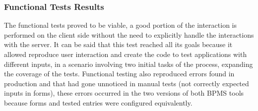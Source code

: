 \documentclass[runningheads,a4paper]{llncs}
\begin{document}
\subsubsection{Functional Tests Results}
The functional tests proved to be viable, a good portion of the interaction is performed on the client side without the need to explicitly handle the interactions with the server. It can be said that this test reached all its goals because it allowed reproduce user interaction and create the code to test applications with different inputs, in a scenario involving two initial tasks of the process, expanding the coverage of the tests. Functional testing also reproduced errors found in production and that had gone unnoticed in manual tests (not correctly expected inputs in forms), these errors occurred in the two versions of both BPMS tools because forms and tested entries were configured equivalently.
\end{document}
